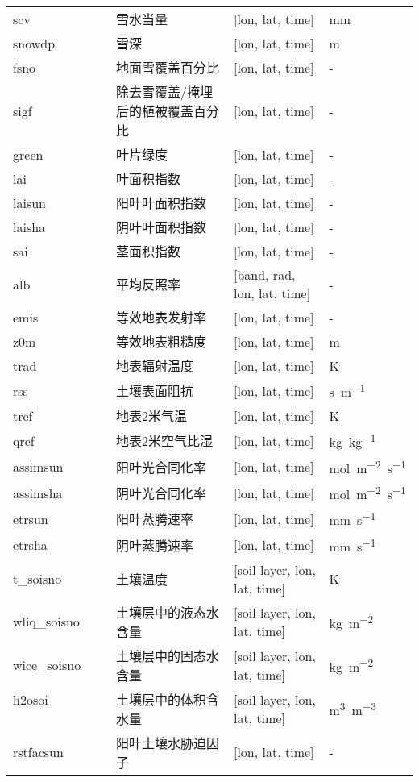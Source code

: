 {\begin{longtable}[htbp]{lp{}p{}l}
scv & 雪水当量 & {[}lon, lat, time{]}  & mm \\
snowdp & 雪深 & {[}lon, lat, time{]}  & m \\
fsno & 地面雪覆盖百分比 & {[}lon, lat, time{]}  & - \\
sigf & 除去雪覆盖/掩埋后的植被覆盖百分比 & {[}lon, lat, time{]}  & - \\
green & 叶片绿度 & {[}lon, lat, time{]}  & - \\
lai & 叶面积指数 & {[}lon, lat, time{]}  & - \\
laisun & 阳叶叶面积指数 & {[}lon, lat, time{]}  & - \\
laisha & 阴叶叶面积指数 & {[}lon, lat, time{]}  & - \\
sai & 茎面积指数 & {[}lon, lat, time{]}  & - \\
alb & 平均反照率 & {[}band, rad, lon, lat, time{]}  & - \\ %
emis & 等效地表发射率 & {[}lon, lat, time{]}  & - \\
z0m & 等效地表粗糙度 & {[}lon, lat, time{]}  & m \\
trad & 地表辐射温度 & {[}lon, lat, time{]}  & K \\
rss & 土壤表面阻抗 & {[}lon, lat, time{]} & \unit{s.m^{-1}}\\
tref & 地表2米气温 & {[}lon, lat, time{]}  & K \\
qref & 地表2米空气比湿 & {[}lon, lat, time{]}  & \unit{kg.kg^{-1}} \\
assimsun  & 阳叶光合同化率 & {[}lon, lat, time{]}  & \unit{mol.m^{-2}.s^{-1}} \\
assimsha  & 阴叶光合同化率 & {[}lon, lat, time{]}  & \unit{mol.m^{-2}.s^{-1}} \\
etrsun  & 阳叶蒸腾速率 & {[}lon, lat, time{]}  & \unit{mm.s^{-1}} \\
etrsha & 阴叶蒸腾速率 & {[}lon, lat, time{]}  & \unit{mm.s^{-1}} \\
t\_soisno ~ ~ ~ & 土壤温度 & {[}soil layer, lon, lat, time{]} & K \\
wliq\_soisno~ ~ & 土壤层中的液态水含量 & {[}soil layer, lon, lat, time{]} & \unit{kg.m^{-2}} \\
wice\_soisno~ ~ & 土壤层中的固态水含量& {[}soil layer, lon, lat, time{]} & \unit{kg.m^{-2}} \\
h2osoi ~ ~ ~ ~ ~ ~ ~ & 土壤层中的体积含水量 & {[}soil layer, lon, lat,
time{]}  & \unit{m^3.m^{-3}} \\
rstfacsun ~ ~ & 阳叶土壤水胁迫因子 & {[}lon, lat, time{]}  & - \\

\end{longtable}}
